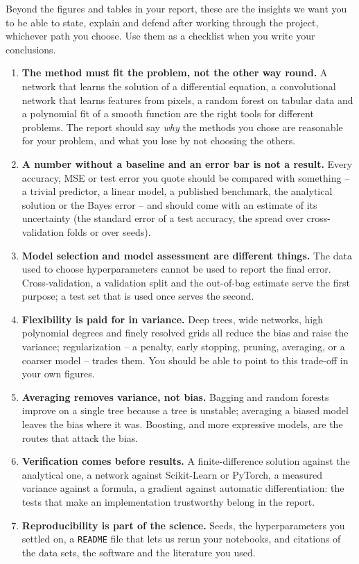 \documentclass[11pt,a4paper]{article}
\begin{document}
Beyond the figures and tables in your report, these are the insights we want
you to be able to state, explain and defend after working through the
project, whichever path you choose.  Use them as a checklist when you write
your conclusions.
\begin{enumerate}[nosep]
  \item \textbf{The method must fit the problem, not the other way round.}
        A network that learns the solution of a differential equation, a
        convolutional network that learns features from pixels, a random
        forest on tabular data and a polynomial fit of a smooth function are
        the right tools for different problems.  The report should say
        \emph{why} the methods you chose are reasonable for your problem,
        and what you lose by not choosing the others.
  \item \textbf{A number without a baseline and an error bar is not a
        result.}  Every accuracy, MSE or test error you quote should be
        compared with something -- a trivial predictor, a linear model, a
        published benchmark, the analytical solution or the Bayes error --
        and should come with an estimate of its uncertainty (the standard
        error of a test accuracy, the spread over cross-validation folds or
        over seeds).
  \item \textbf{Model selection and model assessment are different things.}
        The data used to choose hyperparameters cannot be used to report the
        final error.  Cross-validation, a validation split and the
        out-of-bag estimate serve the first purpose; a test set that is used
        once serves the second.
  \item \textbf{Flexibility is paid for in variance.}  Deep trees, wide
        networks, high polynomial degrees and finely resolved grids all
        reduce the bias and raise the variance; regularization -- a penalty,
        early stopping, pruning, averaging, or a coarser model -- trades
        them.  You should be able to point to this trade-off in your own
        figures.
  \item \textbf{Averaging removes variance, not bias.}  Bagging and random
        forests improve on a single tree because a tree is unstable;
        averaging a biased model leaves the bias where it was.  Boosting,
        and more expressive models, are the routes that attack the bias.
  \item \textbf{Verification comes before results.}  A finite-difference
        solution against the analytical one, a network against
        Scikit-Learn or PyTorch, a measured variance against a formula, a
        gradient against automatic differentiation: the tests that make an
        implementation trustworthy belong in the report.
  \item \textbf{Reproducibility is part of the science.}  Seeds, the
        hyperparameters you settled on, a \texttt{README} file that lets us
        rerun your notebooks, and citations of the data sets, the software
        and the literature you used.
\end{enumerate}
\end{document}
